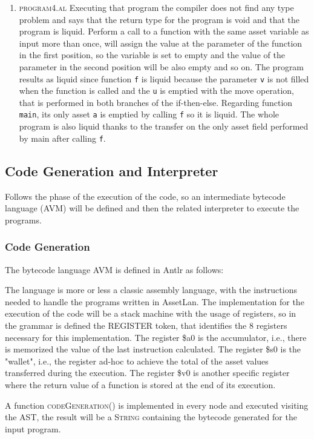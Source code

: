 \documentclass[11pt]{article} %
\begin{document}
\begin{enumerate}
\item \textsc{program4.al}   
Executing that program the compiler does not find any type problem and says that the return type for the program is void and that the program is liquid. Perform a call to a function with the same asset variable as input more than once, will assign the value at the parameter of the function in the first position, so the variable is set to empty and the value of the parameter in the second position will be also empty and so on. The program results as liquid since function \verb|f| is liquid because the parameter \verb|v| is not filled when the function is called and the \verb|u| is emptied with the move operation, that is performed in both branches of the if-then-else. Regarding function \verb|main|, its only asset \verb|a| is emptied by calling \verb|f| so it is liquid. The whole program is also liquid thanks to the transfer on the only asset field performed by main after calling \verb|f|.
\end{enumerate}

\subsection{Code Generation and Interpreter}
Follows the phase of the execution of the code, so an intermediate bytecode language (AVM) will be defined and then the related interpreter to execute the programs.

\subsubsection{Code Generation}
The bytecode language AVM is defined in Antlr as follows:

The language is more or less a classic assembly language, with the instructions needed to handle the programs written in AssetLan. The implementation for the execution of the code will be a stack machine with the usage of registers, so in the grammar is defined the REGISTER token, that identifies the $8$ registers  necessary for this implementation. The register \$a0 is the accumulator, i.e., there is memorized the value of the last instruction calculated. The register \$s0 is the "wallet", i.e., the register ad-hoc to achieve the total of the asset values transferred during the execution. The register \$v0 is another specific register where the return value of a function is stored at the end of its execution.

\medskip

A function \textsc{codeGeneration()} is implemented in every node and executed visiting the AST, the result will be a \textsc{String} containing the bytecode generated for the input program. 
\end{document}
